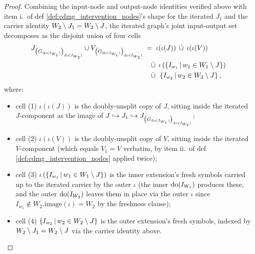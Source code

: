 \documentclass[main]{subfiles}
\begin{document}
\begin{proof}
Combining the input-node and output-node identities verified above with item i.\ of def \ref{def:cdmg_intervention_nodes}'s shape for the iterated $J_1$ and the carrier identity $W_2 \setminus J_1 = W_2 \setminus J$, the iterated graph's joint input-output set decomposes as the disjoint union of four cells
\begin{align*}
    J_{\left ( G_{\operatorname{do}(I_{W_1})} \right )_{\operatorname{do}(I_{W_2})}} \cup V_{\left ( G_{\operatorname{do}(I_{W_1})} \right )_{\operatorname{do}(I_{W_2})}}
        &\;=\; \iota(\iota(J)) \;\,\dot{\cup}\,\; \iota(\iota(V)) \\
        &\quad\,\dot{\cup}\,\; \iota\left (\left \{ I_{w_1} \,\middle|\, w_1 \in W_1 \setminus J \right \}\right ) \\
        &\quad\,\dot{\cup}\,\; \left \{ I_{w_2} \,\middle|\, w_2 \in W_2 \setminus J \right \},
\end{align*}
where:
\begin{itemize}
    \item cell (1) $\iota(\iota(J))$ is the doubly-unsplit copy of $J$, sitting inside the iterated $J$-component as the image of $J \hookrightarrow J_1 \hookrightarrow J_{\left ( G_{\operatorname{do}(I_{W_1})} \right )_{\operatorname{do}(I_{W_2})}}$;
    \item cell (2) $\iota(\iota(V))$ is the doubly-unsplit copy of $V$, sitting inside the iterated $V$-component (which equals $V_1 = V$ verbatim, by item ii.\ of def \ref{def:cdmg_intervention_nodes} applied twice);
    \item cell (3) $\iota\left (\left \{ I_{w_1} \,\middle|\, w_1 \in W_1 \setminus J \right \}\right )$ is the inner extension's fresh symbols carried up to the iterated carrier by the outer $\iota$ (the inner $\operatorname{do}(I_{W_1})$ produces these, and the outer $\operatorname{do}(I_{W_2})$ leaves them in place via the outer $\iota$ since $I_{w_1} \notin W_2.\mathrm{image}(\iota) = W_2$ by the freshness clause);
    \item cell (4) $\left \{ I_{w_2} \,\middle|\, w_2 \in W_2 \setminus J \right \}$ is the outer extension's fresh symbols, indexed by $W_2 \setminus J_1 = W_2 \setminus J$ via the carrier identity above.
\end{itemize}


\end{proof}
\end{document}
